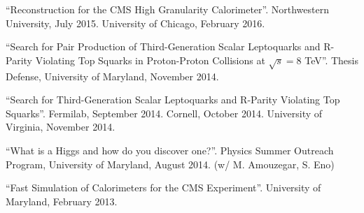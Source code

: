 \begin{description}[leftmargin=12pt,font=\normalfont,labelsep=0em]
\item ``Reconstruction for the CMS High Granularity Calorimeter''. Northwestern University, July 2015. University of Chicago, February 2016.
\item ``Search for Pair Production of Third-Generation Scalar Leptoquarks and R-Parity Violating Top Squarks in Proton-Proton Collisions at $\sqrt{s}=8$ TeV''. Thesis Defense, University of Maryland, November 2014.
\item ``Search for Third-Generation Scalar Leptoquarks and R-Parity Violating Top Squarks''. Fermilab, September 2014. Cornell, October 2014. University of Virginia, November 2014.
\item ``What is a Higgs and how do you discover one?''. Physics Summer Outreach Program, University of Maryland, August 2014. (w/ M. Amouzegar, S. Eno)
\item ``Fast Simulation of Calorimeters for the CMS Experiment''. University of Maryland, February 2013.
\end{description}

\ifdefined\longflag
